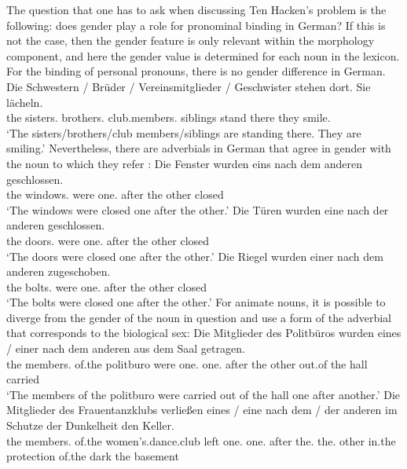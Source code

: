 The question that one has to ask when discussing Ten Hacken's problem is the following: does gender play a role for pronominal binding
in German? If this is not the case, then the gender feature is only relevant within the morphology
component, and here the gender value is determined for each noun in the lexicon. For the binding of personal pronouns, there is no gender difference in German. 
\ea
\gll Die Schwestern / Brüder / Vereinsmitglieder / Geschwister stehen dort. Sie lächeln.\\
     the sisters.\fem{} {} brothers.\mas{} {} club.members.\neu{} {} siblings stand there they smile.\\
\glt `The sisters/brothers/club members/siblings are standing there. They are smiling.'
\z
Nevertheless, there are adverbials in German that agree in gender with the noun to which they refer \citep[Chapter~6]{Hoehle83}:
\eal
\label{Beispiel-einer-nach-dem-anderen}
\ex
\gll Die Fenster wurden eins nach dem anderen geschlossen.\\
	 the windows.\neu{} were one.\neu{} after the other closed\\
\glt `The windows were closed one after the other.'
\ex 
\gll Die Türen wurden eine nach der anderen geschlossen.\\
	the doors.\fem{} were one.\fem{} after the other closed\\
\glt `The doors were closed one after the other.'
\ex 
\gll Die Riegel wurden einer nach dem anderen zugeschoben.\\
	 the bolts.\mas{} were one.\mas{} after the other closed\\
	 \glt `The bolts were closed one after the other.'
\zl
For animate nouns, it is possible to diverge from the gender of the noun in question and use a form of
the adverbial that corresponds to the biological sex:
\eal
\ex 
\gll Die Mitglieder des Politbüros wurden eines / einer nach dem anderen aus dem Saal getragen.\\
	 the members.\neu{} of.the politburo were one.\neu{} {} one.\mas{} after the other out.of the hall carried\\
\glt `The members of the politburo were carried out of the hall one after another.'
\ex 
\gll Die Mitglieder des Frauentanzklubs verließen eines / eine nach dem / der anderen im Schutze der Dunkelheit den
Keller.\\
the members.\neu{} of.the women's.dance.club left one.\neu{} {} one.\fem{} after the.\neu{} {} the.\fem{} other in.the protection of.the dark the
basement\\
